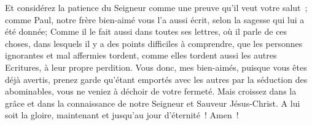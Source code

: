 \begin{multicols}{2}
Et considérez la patience du Seigneur comme une preuve qu'il veut votre salut~; comme Paul, notre frère bien-aimé vous l'a aussi écrit, selon la sagesse qui lui a été donnée;
Comme il le fait aussi dans toutes ses lettres, où il parle de ces choses, dans lesquels il y a des points difficiles à comprendre, que les personnes ignorantes et mal affermies tordent, comme elles tordent aussi les autres Ecritures, à leur propre perdition.
Vous donc, mes bien-aimés, puisque vous êtes déjà avertis, prenez garde qu'étant emportés avec les autres par la séduction des abominables, vous ne veniez à déchoir de votre fermeté.
Mais croissez dans la grâce et dans la connaissance de notre Seigneur et Sauveur Jésus-Christ. A lui soit la gloire, maintenant et jusqu'au jour d'éternité~! Amen~!
\PPE{}
\end{multicols}
